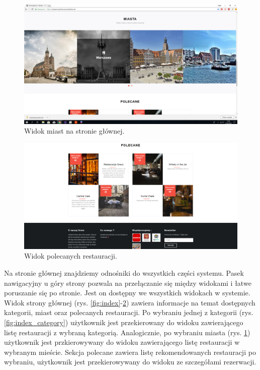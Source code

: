 \documentclass{article}
\begin{document}
\begin{figure}[H]
\centering
	\includegraphics[width=1.00\textwidth]{screens/index3.png}
	\caption{Widok miast na stronie głównej.}
	\label{fig:index_cities}
\end{figure}

\begin{figure}[H]
\centering
	\includegraphics[width=1.00\textwidth]{screens/index4.png}
	\caption{Widok polecanych restauracji.}
	\label{fig:index_recomended}
\end{figure}

Na stronie głównej znajdziemy odnośniki do wszystkich części systemu. Pasek nawigacyjny u góry strony pozwala na przełączanie się między widokami i łatwe poruszanie się po stronie. Jest on dostępny we wszystkich widokach w systemie. Widok strony głównej (rys. \ref{fig:index}-\ref{fig:index_recomended}) zawiera informacje na temat dostępnych kategorii, miast oraz polecanych restauracji. Po wybraniu jednej z kategorii (rys. \ref{fig:index_category}) użytkownik jest przekierowany do widoku zawierającego listę restauracji z wybraną kategorią. Analogicznie, po wybraniu miasta (rys. \ref{fig:index_cities}) użytkownik jest przkierowywany do widoku zawierającego listę restauracji w wybranym mieście. Sekcja polecane zawiera listę rekomendowanych restauracji po wybraniu, użytkownik jest przekierowywany do widoku ze szczegółami rezerwacji.
\end{document}
